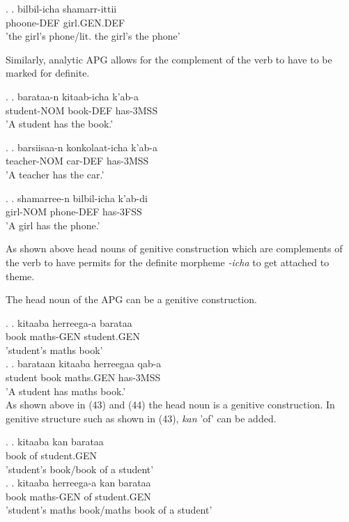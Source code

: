 \documentclass[11pt,a4paper]{article}
\begin{document}
	\ex.
	\ag.
	bilbil-icha shamarr-ittii\\
	phoone-DEF girl.GEN.DEF\\
	'the girl's phone/lit. the girl's the phone'
	
	Similarly, analytic APG allows for the complement of the verb to have to be marked for definite. 
	
	\ex.
	\ag.
	barataa-n kitaab-icha k'ab-a\\
	student-NOM book-DEF has-3MSS\\
	'A student has the book.'
	
	\ex.
	\ag.
	barsiisaa-n konkolaat-icha k'ab-a\\
	teacher-NOM car-DEF has-3MSS\\
	'A teacher has the car.'
	
	\ex.
	\ag.
	shamarree-n bilbil-icha k'ab-di\\
	girl-NOM phone-DEF has-3FSS\\
	'A girl has the phone.'
	
	As shown above head nouns of genitive construction which are complements of the verb to have permits  for the definite morpheme \emph{-icha} to get attached to theme.
	
	
	The head noun of the APG can be a genitive construction. 
	
	\ex.
	\ag.
	kitaaba herreega-a barataa\\
	book maths-GEN student.GEN\\
	'student's maths book'\\

	\ex.
	\ag.
	barataan kitaaba herreegaa qab-a\\
	student book  maths.GEN has-3MSS\\
	'A student has maths book.'\\
	
	As shown above  in (43) and (44) the head noun is a genitive construction. In genitive structure such as shown in (43), \emph{kan} 'of' can be added. 
	
	\ex.
	\ag.
	kitaaba kan barataa\\
	book of student.GEN\\
	'student's book/book of a student'\\
	
	\ex.
	\ag.
	kitaaba herreega-a kan barataa\\
	book maths-GEN of student.GEN\\
	'student's maths book/maths book of a student'\\
	
\end{document}
